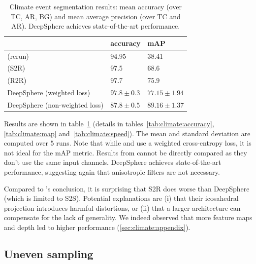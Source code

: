 \documentclass{article} %
\newcommand{\tabref}[1]{table~\ref{tab:#1}}
\begin{document}
\begin{table}
	\centering
	\begin{tabular}{l l l}
	\toprule
	& accuracy & mAP \\
	\midrule
	\cite{jiang2019sphericalcnn} (rerun) & 94.95 & 38.41 \\
	\cite{cohen2019gauge} (S2R) & 97.5 & 68.6 \\
	\cite{cohen2019gauge} (R2R) & 97.7 & 75.9 \\
	DeepSphere (weighted loss) & $97.8\pm 0.3$ & $77.15\pm 1.94$ \\
	DeepSphere (non-weighted loss) & $87.8\pm 0.5$ & $89.16\pm 1.37$ \\
	\bottomrule
	\end{tabular}
	\caption{
		Climate event segmentation results: mean accuracy (over TC, AR, BG) and mean average precision (over TC and AR).
		DeepSphere achieves state-of-the-art performance. %
	}
	\label{tab:climate}
\end{table}

Results are shown in \tabref{climate} (details in tables~\ref{tab:climate:accuracy}, \ref{tab:climate:map} and~\ref{tab:climate:speed}).
The mean and standard deviation are computed over 5 runs.
Note that while \citet{jiang2019sphericalcnn} and \citet{cohen2019gauge} use a weighted cross-entropy loss, it is not ideal for the mAP metric.
Results from \citet{mudigonda2017climateevents} cannot be directly compared as they don't use the same input channels.
DeepSphere achieves state-of-the-art performance, suggesting again that anisotropic filters are not necessary.

Compared to \citet{cohen2019gauge}'s conclusion, it is surprising that S2R does worse than DeepSphere (which is limited to S2S).
Potential explanations are (i) that their icosahedral projection introduces harmful distortions, or (ii) that a larger architecture can compensate for the lack of generality. %
We indeed observed that more feature maps and depth led to higher performance (\ref{sec:climate:appendix}).

\subsection{Uneven sampling} \label{sec:exp:ghcn}
\end{document}
